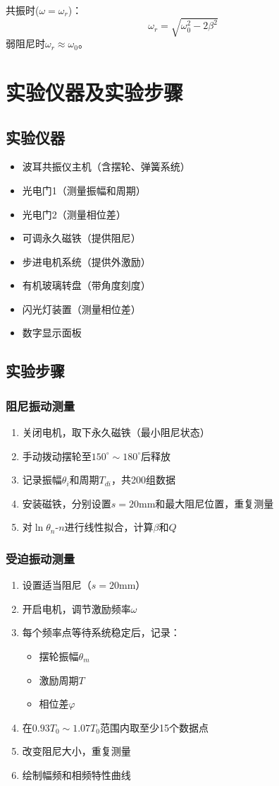 \documentclass[UTF8]{ctexart}
\begin{document}
共振时($\omega=\omega_r$)：
\[ \omega_r = \sqrt{\omega_0^2 - 2\beta^2} \]
弱阻尼时$\omega_r \approx \omega_0$。

\section{实验仪器及实验步骤}
\subsection{实验仪器}
\begin{itemize}
\item 波耳共振仪主机（含摆轮、弹簧系统）
\item 光电门1（测量振幅和周期）
\item 光电门2（测量相位差）
\item 可调永久磁铁（提供阻尼）
\item 步进电机系统（提供外激励）
\item 有机玻璃转盘（带角度刻度）
\item 闪光灯装置（测量相位差）
\item 数字显示面板
\end{itemize}

\subsection{实验步骤}
\subsubsection{阻尼振动测量}
\begin{enumerate}
\item 关闭电机，取下永久磁铁（最小阻尼状态）
\item 手动拨动摆轮至$150^\circ\sim180^\circ$后释放
\item 记录振幅$\theta_i$和周期$T_{di}$，共200组数据
\item 安装磁铁，分别设置$s=20$mm和最大阻尼位置，重复测量
\item 对$\ln\theta_n$-$n$进行线性拟合，计算$\beta$和$Q$
\end{enumerate}

\subsubsection{受迫振动测量}
\begin{enumerate}
\item 设置适当阻尼（$s=20$mm）
\item 开启电机，调节激励频率$\omega$
\item 每个频率点等待系统稳定后，记录：
\begin{itemize}
\item 摆轮振幅$\theta_m$
\item 激励周期$T$
\item 相位差$\varphi$
\end{itemize}
\item 在$0.93T_0\sim1.07T_0$范围内取至少15个数据点
\item 改变阻尼大小，重复测量
\item 绘制幅频和相频特性曲线
\end{enumerate}
\end{document}
